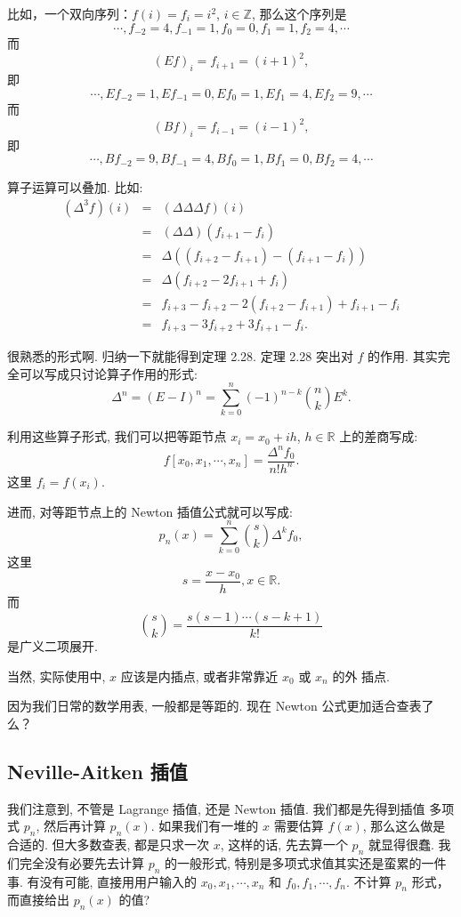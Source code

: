 \documentclass[a4paper]{ctexart}
\begin{document}
比如，一个双向序列：$f(i) = f_i = i^2$, $i \in \mathbb{Z}$, 那么这个序列是
\[
\cdots, f_{-2} = 4, f_{-1} = 1, f_0 = 0, f_1 = 1, f_2 = 4, \cdots
\]
而
\[
(Ef)_i = f_{i + 1} = (i + 1)^2,
\]
即
\[
\cdots, Ef_{-2} = 1, Ef_{-1} = 0, Ef_0 = 1, Ef_1 = 4, Ef_2 = 9, \cdots
\]
而
\[
(Bf)_i = f_{i - 1} = (i - 1)^2,
\]
即
\[
\cdots, Bf_{-2} = 9, Bf_{-1} = 4, Bf_0 = 1, Bf_1 = 0, Bf_2 = 4, \cdots
\]

算子运算可以叠加. 比如:
$$
\begin{array}{rcl}
  (\Delta^3 f)(i) &=& (\Delta \Delta \Delta f)(i) \\
  &=& (\Delta \Delta) (f_{i + 1} - f_i) \\
  &=& \Delta ((f_{i + 2} - f_{i + 1}) - (f_{i + 1} - f_i)) \\
  &=& \Delta (f_{i + 2} - 2 f_{i + 1} + f_i) \\
  &=& f_{i + 3} - f_{i + 2} - 2(f_{i + 2} - f_{i + 1}) + f_{i + 1} - f_i \\
  &=& f_{i + 3} - 3 f_{i + 2} + 3 f_{i + 1} - f_i.
\end{array}
$$

很熟悉的形式啊. 归纳一下就能得到定理 2.28. 定理 2.28 突出对 $f$ 的作用.
其实完全可以写成只讨论算子作用的形式:
$$
\Delta^n = (E - I)^n = \sum_{k = 0}^n (-1)^{n - k}{n \choose k}E^k.
$$

利用这些算子形式, 我们可以把等距节点 $x_i = x_0 + ih$, $h \in
\mathbb{R}$ 上的差商写成:
$$
f[x_0, x_1, \cdots, x_n] = \frac{\Delta^n f_0}{n! h^n}.
$$
这里 $f_i = f(x_i)$.

进而, 对等距节点上的 Newton 插值公式就可以写成:
$$
p_n(x) = \sum_{k = 0}^n {s \choose k} \Delta^k f_0,
$$
这里
$$
s = \frac{x - x_0}h, x \in \mathbb{R}.
$$
而
$$
{s \choose k} = \frac{s(s - 1)\cdots(s - k + 1)}{k!}
$$
是广义二项展开.

当然, 实际使用中, $x$ 应该是内插点, 或者非常靠近 $x_0$ 或 $x_n$ 的外
插点.

因为我们日常的数学用表, 一般都是等距的. 现在 Newton 公式更加适合查表了么？

\subsection{Neville-Aitken 插值}

我们注意到, 不管是 Lagrange 插值, 还是 Newton 插值. 我们都是先得到插值
多项式 $p_n$, 然后再计算 $p_n(x)$. 如果我们有一堆的 $x$ 需要估算
$f(x)$, 那么这么做是合适的. 但大多数查表, 都是只求一次 $x$, 这样的话,
先去算一个 $p_n$ 就显得很蠢. 我们完全没有必要先去计算 $p_n$ 的一般形式,
特别是多项式求值其实还是蛮累的一件事. 有没有可能, 
直接用用户输入的 $x_0, x_1, \cdots, x_n$ 和 $f_0, f_1,
\cdots, f_n$. 不计算 $p_n$ 形式，而直接给出 $p_n(x)$ 的值?
\end{document}
